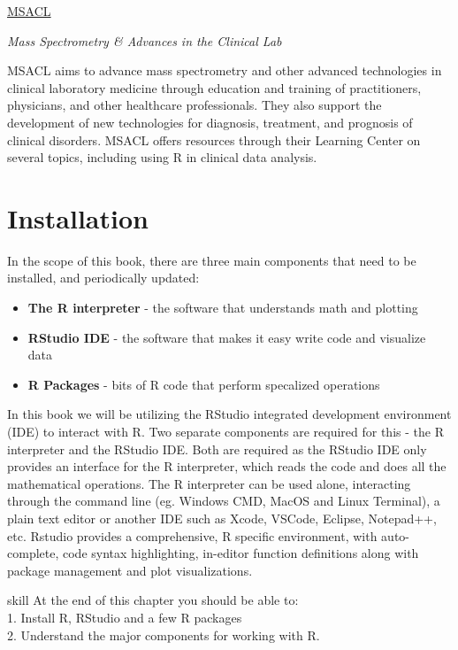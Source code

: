 \documentclass[
]{book}
\begin{document}
\href{https://www.msacl.org/}{MSACL}

\emph{Mass Spectrometry \& Advances in the Clinical Lab}

MSACL aims to advance mass spectrometry and other advanced technologies in clinical laboratory medicine through education and training of practitioners, physicians, and other healthcare professionals. They also support the development of new technologies for diagnosis, treatment, and prognosis of clinical disorders. MSACL offers resources through their Learning Center on several topics, including using R in clinical data analysis.

\hypertarget{installation}{%
\chapter{Installation}\label{installation}}

In the scope of this book, there are three main components that need to be installed, and periodically updated:

\begin{itemize}
\item
  \textbf{The R interpreter} - the software that understands math and plotting
\item
  \textbf{RStudio IDE} - the software that makes it easy write code and visualize data
\item
  \textbf{R Packages} - bits of R code that perform specalized operations
\end{itemize}

In this book we will be utilizing the RStudio integrated development environment (IDE) to interact with R. Two separate components are required for this - the R interpreter and the RStudio IDE. Both are required as the RStudio IDE only provides an interface for the R interpreter, which reads the code and does all the mathematical operations. The R interpreter can be used alone, interacting through the command line (eg. Windows CMD, MacOS and Linux Terminal), a plain text editor or another IDE such as Xcode, VSCode, Eclipse, Notepad++, etc. Rstudio provides a comprehensive, R specific environment, with auto-complete, code syntax highlighting, in-editor function definitions along with package management and plot visualizations.

\begin{infobox}{skill}
At the end of this chapter you should be able to:\\
1. Install R, RStudio and a few R packages\\
2. Understand the major components for working with R.

\end{infobox}
\end{document}
